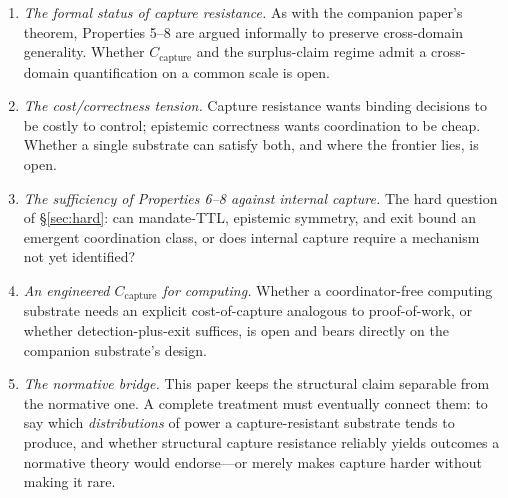 \documentclass[11pt]{article}
\theoremstyle{definition}
\theoremstyle{plain}
\begin{document}
\begin{enumerate}
\item \emph{The formal status of capture resistance.} As with the companion paper's
  theorem, Properties 5--8 are argued informally to preserve cross-domain
  generality. Whether $C_{\text{capture}}$ and the surplus-claim regime admit a
  cross-domain quantification on a common scale is open.

\item \emph{The cost/correctness tension.} Capture resistance wants binding decisions
  to be costly to control; epistemic correctness wants coordination to be cheap.
  Whether a single substrate can satisfy both, and where the frontier lies, is open.

\item \emph{The sufficiency of Properties 6--8 against internal capture.} The hard
  question of \S\ref{sec:hard}: can mandate-TTL, epistemic symmetry, and exit bound
  an emergent coordination class, or does internal capture require a mechanism not
  yet identified?

\item \emph{An engineered $C_{\text{capture}}$ for computing.} Whether a
  coordinator-free computing substrate needs an explicit cost-of-capture analogous
  to proof-of-work, or whether detection-plus-exit suffices, is open and bears
  directly on the companion substrate's design.

\item \emph{The normative bridge.} This paper keeps the structural claim separable
  from the normative one. A complete treatment must eventually connect them: to say
  which \emph{distributions} of power a capture-resistant substrate tends to
  produce, and whether structural capture resistance reliably yields outcomes a
  normative theory would endorse---or merely makes capture harder without making it
  rare.
\end{enumerate}


\end{document}
